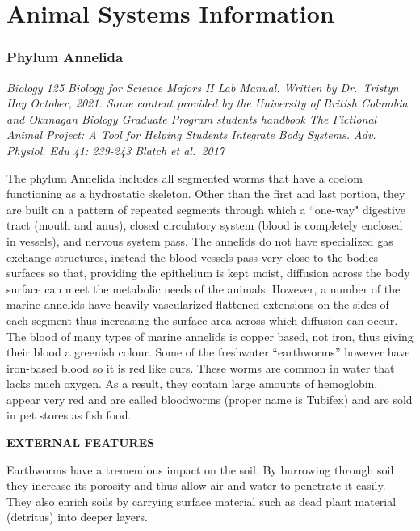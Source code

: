 \documentclass[
]{book}
\begin{document}
\hypertarget{animal-systems-information}{%
\chapter*{Animal Systems Information}\label{animal-systems-information}}

\hypertarget{phylum-annelida}{%
\subsection*{Phylum Annelida}\label{phylum-annelida}}

\emph{Biology 125 Biology for Science Majors II Lab Manual. Written by Dr.~Tristyn Hay October, 2021. Some content provided by the University of British Columbia and Okanagan Biology Graduate Program students handbook The Fictional Animal Project: A Tool for Helping Students Integrate Body Systems. Adv. Physiol. Edu 41: 239-243 Blatch et al.~2017}

The phylum Annelida includes all segmented worms that have a coelom functioning as a hydrostatic skeleton. Other than the first and last portion, they are built on a pattern of repeated segments through which a ``one-way" digestive tract (mouth and anus), closed circulatory system (blood is completely enclosed in vessels), and nervous system pass. The annelids do not have specialized gas exchange structures, instead the blood vessels pass very close to the bodies surfaces so that, providing the epithelium is kept moist, diffusion across the body surface can meet the metabolic needs of the animals. However, a number of the marine annelids have heavily vascularized flattened extensions on the sides of each segment thus increasing the surface area across which diffusion can occur. The blood of many types of marine annelids is copper based, not iron, thus giving their blood a greenish colour. Some of the freshwater ``earthworms'' however have iron-based blood so it is red like ours. These worms are common in water that lacks much oxygen. As a result, they contain large amounts of hemoglobin, appear very red and are called bloodworms (proper name is Tubifex) and are sold in pet stores as fish food.

\textbf{EXTERNAL FEATURES}

Earthworms have a tremendous impact on the soil. By burrowing through soil they increase its porosity and thus allow air and water to penetrate it easily. They also enrich soils by carrying surface material such as dead plant material (detritus) into deeper layers.
\end{document}

